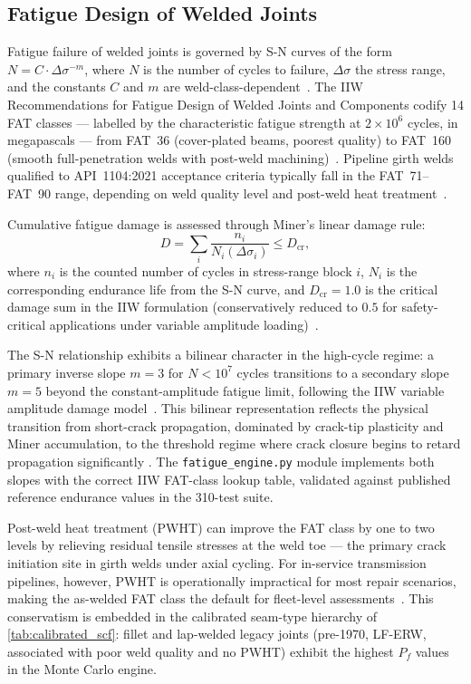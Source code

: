\subsection{Fatigue Design of Welded Joints}
\label{subsec:lit_fatigue}

Fatigue failure of welded joints is governed by S-N curves of the form
$N = C \cdot \Delta\sigma^{-m}$, where $N$ is the number of cycles to
failure, $\Delta\sigma$ the stress range, and the constants $C$ and $m$
are weld-class-dependent~\cite{IIW_Fatigue:2016}.  The \ac{IIW}
Recommendations for Fatigue Design of Welded Joints and Components
codify 14 FAT classes — labelled by the characteristic fatigue strength
at $2 \times 10^6$ cycles, in megapascals — from FAT~36 (cover-plated
beams, poorest quality) to FAT~160 (smooth full-penetration welds with
post-weld machining)~\cite{IIW_Fatigue:2016,Murakami2002}.  Pipeline
girth welds qualified to API~1104:2021 acceptance criteria typically
fall in the FAT~71--FAT~90 range, depending on weld quality level and
post-weld heat treatment~\cite{API1104:2021}.

Cumulative fatigue damage is assessed through Miner's linear damage rule:
\begin{equation}
  D = \sum_i \frac{n_i}{N_i(\Delta\sigma_i)} \leq D_\mathrm{cr},
  \label{eq:miners_rule}
\end{equation}
where $n_i$ is the counted number of cycles in stress-range block $i$,
$N_i$ is the corresponding endurance life from the S-N curve, and
$D_\mathrm{cr} = 1.0$ is the critical damage sum in the IIW
formulation (conservatively reduced to $0.5$ for safety-critical
applications under variable amplitude loading)~\cite{IIW_Fatigue:2016}.

The S-N relationship exhibits a bilinear character in the high-cycle
regime: a primary inverse slope $m = 3$ for $N < 10^7$ cycles
transitions to a secondary slope $m = 5$ beyond the constant-amplitude
fatigue limit, following the IIW variable amplitude damage
model~\cite{IIW_Fatigue:2016}.  This bilinear representation reflects
the physical transition from short-crack propagation, dominated by
crack-tip plasticity and Miner accumulation, to the threshold regime
where crack closure begins to retard propagation significantly
\cite{Murakami2002,Anderson2005}.  The \texttt{fatigue\_engine.py}
module implements both slopes with the correct IIW FAT-class lookup
table, validated against published reference endurance values in the
310-test suite.

Post-weld heat treatment (\acs{PWHT}) can improve the FAT class by one
to two levels by relieving residual tensile stresses at the weld toe —
the primary crack initiation site in girth welds under axial cycling.
For in-service transmission pipelines, however, \acs{PWHT} is
operationally impractical for most repair scenarios, making the
as-welded FAT class the default for fleet-level assessments~\cite{API1104:2021,
Francis2014}.  This conservatism is embedded in the calibrated seam-type
hierarchy of \cref{tab:calibrated_scf}: fillet and lap-welded legacy
joints (pre-1970, LF-ERW, associated with poor weld quality and no
\acs{PWHT}) exhibit the highest $P_f$ values in the Monte Carlo engine.

